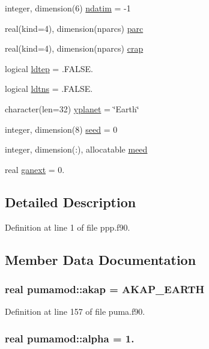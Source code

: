 \begin{DoxyCompactItemize}
integer, dimension(6) \hyperlink{classpumamod_ae562873ebeeb138df379c847e7e01ee4}{ndatim} = -\/1
\item 
real(kind=4), dimension(nparcs) \hyperlink{classpumamod_ae2c4727393fa343e9b1bc8a3c74aaadc}{parc}
\item 
real(kind=4), dimension(nparcs) \hyperlink{classpumamod_ade587d2c84caf94c7f54e8d358d42455}{crap}
\item 
logical \hyperlink{classpumamod_ad6ef8c9bbafbe30d455ecbedd0091142}{ldtep} = .\-F\-A\-L\-S\-E.
\item 
logical \hyperlink{classpumamod_ad987421134978995be7290187c82fda2}{ldtns} = .\-F\-A\-L\-S\-E.
\item 
character(len=32) \hyperlink{classpumamod_a903a55d5d849abb77aa4ccb8534add13}{yplanet} = \char`\"{}\-Earth\char`\"{}
\item 
integer, dimension(8) \hyperlink{classpumamod_a79c75848ef94fd2ff5e362ea59c98cbe}{seed} = 0
\item 
integer, dimension(\-:), allocatable \hyperlink{classpumamod_a1909f4521ecd22aa8e00db6e17c10ad9}{meed}
\item 
real \hyperlink{classpumamod_a936da81a07a9bfa83bea326d29f5a5d9}{ganext} = 0.
\end{DoxyCompactItemize}


\subsection{\-Detailed \-Description}


\-Definition at line 1 of file ppp.\-f90.



\subsection{\-Member \-Data \-Documentation}
\hypertarget{classpumamod_a3d53197ec6d14527904d37910baf20ba}{
\subsubsection[{akap}]{\setlength{\rightskip}{0pt plus 5cm}real {\bf pumamod\-::akap} = \-A\-K\-A\-P\-\_\-\-E\-A\-R\-T\-H}}
\label{classpumamod_a3d53197ec6d14527904d37910baf20ba}


\-Definition at line 157 of file puma.\-f90.

\hypertarget{classpumamod_a976863e22669d1d80cb62a3af35e3d4d}{
\subsubsection[{alpha}]{\setlength{\rightskip}{0pt plus 5cm}real {\bf pumamod\-::alpha} = 1.}}
\label{classpumamod_a976863e22669d1d80cb62a3af35e3d4d}


